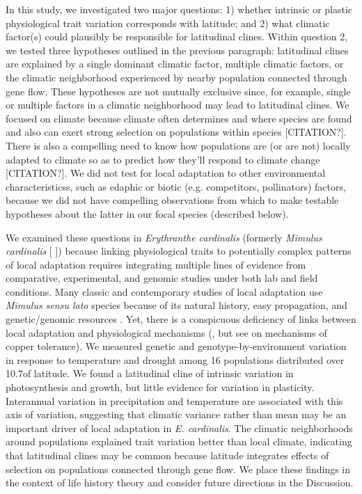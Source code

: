 \documentclass[11pt, oneside]{article}
\begin{document}
In this study, we investigated two major questions: 1) whether intrinsic or plastic physiological trait variation corresponds with latitude; and 2) what climatic factor(s) could plausibly be responsible for latitudinal clines. Within question 2, we tested three hypotheses outlined in the previous paragraph: latitudinal clines are explained by a single dominant climatic factor, multiple climatic factors, or the climatic neighborhood experienced by nearby population connected through gene flow. These hypotheses are not mutually exclusive since, for example, single or multiple factors in a climatic neighborhood may lead to latitudinal clines. We focused on climate because climate often determines and where species are found and also can exert strong selection on populations within species [CITATION?]. There is also a compelling need to know how populations are (or are not) locally adapted to climate so as to predict how they’ll respond to climate change [CITATION?]. We did not test for local adaptation to other environmental characteristicss, such as edaphic or biotic (e.g. competitors, pollinators) factors, because we did not have compelling observations from which to make testable hypotheses about the latter in our focal species (described below). 

We examined these questions in \textit{Erythranthe cardinalis} (formerly \textit{Mimulus cardinalis} [\citeauthor{Nesom_2014} \citeyear{Nesom_2014}]) because linking physiological traits to potentially complex patterns of local adaptation requires integrating multiple lines of evidence from comparative, experimental, and genomic studies under both lab and field conditions. Many classic and contemporary studies of local adaptation use \textit{Mimulus sensu lato} species because of its natural history, easy propagation, and genetic/genomic resources \citep{Clausen_etal_1940, Hiesey_etal_1971, Bradshaw_Schemske_2003, Wu_etal_2008, Lowry_Willis_2010, Wright_etal_2013}. Yet, there is a conspicuous deficiency of links between local adaptation and physiological mechanisms (\cite{Angert_2006, Angert_etal_2008, Wu_etal_2010}, but see \cite{Wright_etal_2013} on mechanisms of copper tolerance). We measured genetic and genotype-by-environment variation in response to temperature and drought among 16 populations distributed over 10.7\textdegree of latitude. We found a latitudinal cline of intrinsic variation in photosynthesis and growth, but little evidence for variation in plasticity. Interannual variation in precipitation and temperature are associated with this axis of variation, suggesting that climatic variance rather than mean may be an important driver of local adaptation in \textit{E. cardinalis}. The climatic neighborhoods around populations explained trait variation better than local climate, indicating that latitudinal clines may be common because latitude integrates effects of selection on populations connected through gene flow. We place these findings in the context of life history theory and consider future directions in the Discussion. 
\end{document}
